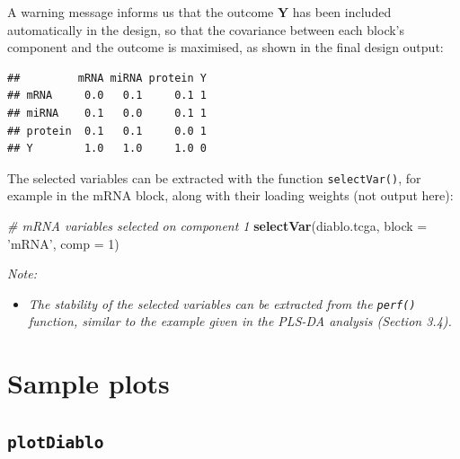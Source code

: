 \documentclass[]{book}
\newenvironment{Shaded}{\begin{snugshade}}{\end{snugshade}}
\newcommand{\CommentTok}[1]{\textcolor[rgb]{0.56,0.35,0.01}{\textit{#1}}}
\newcommand{\DataTypeTok}[1]{\textcolor[rgb]{0.13,0.29,0.53}{#1}}
\newcommand{\DecValTok}[1]{\textcolor[rgb]{0.00,0.00,0.81}{#1}}
\newcommand{\KeywordTok}[1]{\textcolor[rgb]{0.13,0.29,0.53}{\textbf{#1}}}
\newcommand{\NormalTok}[1]{#1}
\newcommand{\OperatorTok}[1]{\textcolor[rgb]{0.81,0.36,0.00}{\textbf{#1}}}
\newcommand{\StringTok}[1]{\textcolor[rgb]{0.31,0.60,0.02}{#1}}
\providecommand{\tightlist}{%
  \setlength{\itemsep}{0pt}\setlength{\parskip}{0pt}}
\begin{document}
A warning message informs us that the outcome \(\boldsymbol Y\) has been included automatically in the design, so that the covariance between each block's component and the outcome is maximised, as shown in the final design output:

\begin{Shaded}
\end{Shaded}

\begin{verbatim}
##         mRNA miRNA protein Y
## mRNA     0.0   0.1     0.1 1
## miRNA    0.1   0.0     0.1 1
## protein  0.1   0.1     0.0 1
## Y        1.0   1.0     1.0 0
\end{verbatim}

The selected variables can be extracted with the function \texttt{selectVar()}, for example in the mRNA block, along with their loading weights (not output here):

\begin{Shaded}
\begin{Highlighting}[]
\CommentTok{# mRNA variables selected on component 1}
\KeywordTok{selectVar}\NormalTok{(diablo.tcga, }\DataTypeTok{block =} \StringTok{'mRNA'}\NormalTok{, }\DataTypeTok{comp =} \DecValTok{1}\NormalTok{)}
\end{Highlighting}
\end{Shaded}

\emph{Note:}

\begin{itemize}
\tightlist
\item
  \emph{The stability of the selected variables can be extracted from the \texttt{perf()} function, similar to the example given in the PLS-DA analysis (Section 3.4).}
\end{itemize}

\hypertarget{diablo:result:sampleplot}{%
\section{Sample plots}\label{diablo:result:sampleplot}}

\hypertarget{plotdiablo}{%
\subsection{\texorpdfstring{\texttt{plotDiablo}}{plotDiablo}}\label{plotdiablo}}
\end{document}

